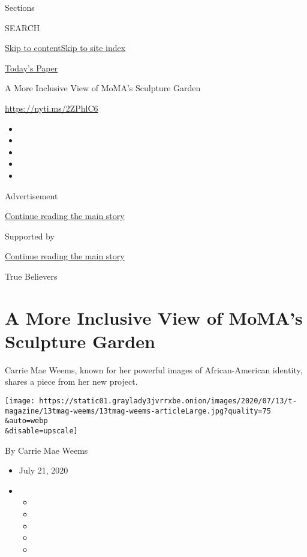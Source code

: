 Sections

SEARCH

\protect\hyperlink{site-content}{Skip to
content}\protect\hyperlink{site-index}{Skip to site index}

\href{https://myaccount.nytimes3xbfgragh.onion/auth/login?response_type=cookie\&client_id=vi}{}

\href{https://www.nytimes3xbfgragh.onion/section/todayspaper}{Today's
Paper}

A More Inclusive View of MoMA's Sculpture Garden

\url{https://nyti.ms/2ZPhlC6}

\begin{itemize}
\item
\item
\item
\item
\item
\end{itemize}

Advertisement

\protect\hyperlink{after-top}{Continue reading the main story}

Supported by

\protect\hyperlink{after-sponsor}{Continue reading the main story}

True Believers

\hypertarget{a-more-inclusive-view-of-momas-sculpture-garden}{%
\section{A More Inclusive View of MoMA's Sculpture
Garden}\label{a-more-inclusive-view-of-momas-sculpture-garden}}

Carrie Mae Weems, known for her powerful images of African-American
identity, shares a piece from her new project.

\texttt{[image: https://static01.graylady3jvrrxbe.onion/images/2020/07/13/t-magazine/13tmag-weems/13tmag-weems-articleLarge.jpg?quality=75\\\&auto=webp\\\&disable=upscale]}

By Carrie Mae Weems

\begin{itemize}
\item
  July 21, 2020
\item
  \begin{itemize}
  \item
  \item
  \item
  \item
  \item
  \end{itemize}
\end{itemize}

